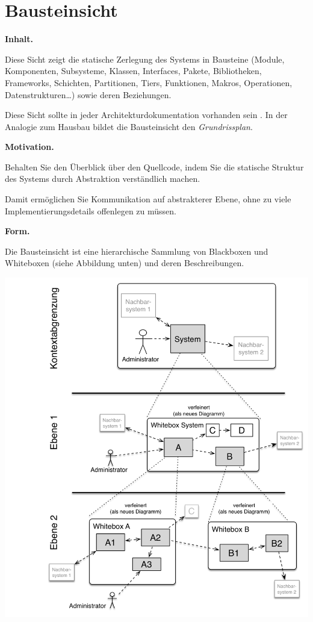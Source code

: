 \documentclass[]{article}
\begin{document}
\section{Bausteinsicht}\label{section-building-block-view}

\textbf{Inhalt.}

Diese Sicht zeigt die statische Zerlegung des Systems in Bausteine
(Module, Komponenten, Subsysteme, Klassen, Interfaces, Pakete,
Bibliotheken, Frameworks, Schichten, Partitionen, Tiers, Funktionen,
Makros, Operationen, Datenstrukturen\ldots{}) sowie deren Beziehungen.

Diese Sicht sollte in jeder Architekturdokumentation vorhanden sein . In
der Analogie zum Hausbau bildet die Bausteinsicht den
\emph{Grundrissplan}.

\textbf{Motivation.}

Behalten Sie den Überblick über den Quellcode, indem Sie die statische
Struktur des Systems durch Abstraktion verständlich machen.

Damit ermöglichen Sie Kommunikation auf abstrakterer Ebene, ohne zu
viele Implementierungsdetails offenlegen zu müssen.

\textbf{Form.}

Die Bausteinsicht ist eine hierarchische Sammlung von Blackboxen und
Whiteboxen (siehe Abbildung unten) und deren Beschreibungen.

\includegraphics{images/05_building_blocks-DE.png}
\end{document}
